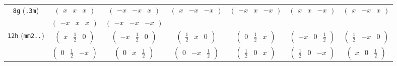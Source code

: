 \documentclass[fleqn,9pt,landscape]{jsarticle}
\begin{document}
\begin{center}
\begin{longtable}{ccccccc}
{\tt 8g} ({\tt .3m}) & $ \begin{pmatrix} x & x & x \end{pmatrix} $ & $ \begin{pmatrix} - x & - x & x \end{pmatrix} $ & $ \begin{pmatrix} x & - x & - x \end{pmatrix} $ & $ \begin{pmatrix} - x & x & - x \end{pmatrix} $ & $ \begin{pmatrix} x & x & - x \end{pmatrix} $ & $ \begin{pmatrix} x & - x & x \end{pmatrix} $ \\
& $ \begin{pmatrix} - x & x & x \end{pmatrix} $ & $ \begin{pmatrix} - x & - x & - x \end{pmatrix} $ & $  $ & $  $ & $  $ & $  $ \\ \hline
{\tt 12h} ({\tt mm2..}) & $ \begin{pmatrix} x & \frac{1}{2} & 0 \end{pmatrix} $ & $ \begin{pmatrix} - x & \frac{1}{2} & 0 \end{pmatrix} $ & $ \begin{pmatrix} \frac{1}{2} & x & 0 \end{pmatrix} $ & $ \begin{pmatrix} 0 & \frac{1}{2} & x \end{pmatrix} $ & $ \begin{pmatrix} - x & 0 & \frac{1}{2} \end{pmatrix} $ & $ \begin{pmatrix} \frac{1}{2} & - x & 0 \end{pmatrix} $ \\
& $ \begin{pmatrix} 0 & \frac{1}{2} & - x \end{pmatrix} $ & $ \begin{pmatrix} 0 & x & \frac{1}{2} \end{pmatrix} $ & $ \begin{pmatrix} 0 & - x & \frac{1}{2} \end{pmatrix} $ & $ \begin{pmatrix} \frac{1}{2} & 0 & x \end{pmatrix} $ & $ \begin{pmatrix} \frac{1}{2} & 0 & - x \end{pmatrix} $ & $ \begin{pmatrix} x & 0 & \frac{1}{2} \end{pmatrix} $ \\ \hline

\end{longtable}
\end{center}
\end{document}
